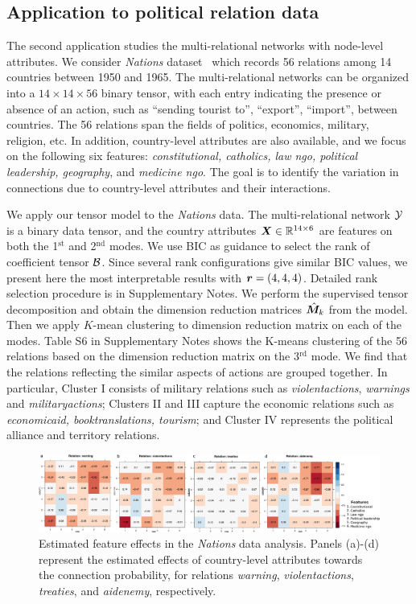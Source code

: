\documentclass[12pt]{article}
\theoremstyle{definition}
\theoremstyle{definition}
\begin{document}
\subsection{Application to political relation data}

The second application studies the multi-relational networks with node-level attributes. We consider \emph{Nations} dataset~\citep{nickel2011three} which records 56 relations among 14 countries between 1950 and 1965. The multi-relational networks can be organized into a $14 \times 14 \times 56$ binary tensor, with each entry indicating the presence or absence of an action, such as ``sending tourist to'', ``export'', ``import'', between countries. The 56 relations span the fields of politics, economics, military, religion, etc. In addition, country-level attributes are also available, and we focus on the following six features: \emph{constitutional, catholics, law ngo, political leadership, geography}, and \emph{medicine ngo}. The goal is to identify the variation in connections due to country-level attributes and their interactions. 

We apply our tensor model to the \emph{Nations} data. The multi-relational network $\mathcal{Y}$ is a binary data tensor, and the country attributes $\bm X\in\mathbb{R}^{14\times 6}$ are features on both the 1$^\text{st}$ and 2$^\text{nd}$ modes. {   We use BIC as guidance to select the rank of coefficient tensor $\mathcal{B}$. Since several rank configurations give similar BIC values, we present here the most interpretable results with $\bm{r}=(4,4,4)$. Detailed rank selection procedure is in Supplementary Notes.}
We perform the supervised tensor decomposition and obtain the dimension reduction matrices $\hat {\bm M}_k$ from the model. Then we apply $K$-mean clustering to dimension reduction matrix on each of the modes. Table S6 in Supplementary Notes shows the K-means clustering of the 56 relations based on the dimension reduction matrix on the 3$^\text{rd}$ mode. We find that the relations reflecting the similar aspects of actions are grouped together. In particular, Cluster I consists of military relations such as \emph{violentactions}, \emph{warnings} and \emph{militaryactions}; Clusters II and III capture the economic relations such as \emph{economicaid, booktranslations, tourism}; and Cluster IV represents the political alliance and territory relations. 

\begin{figure}[!h]
\centering
\includegraphics[width=16cm]{coef.pdf}
\caption{Estimated feature effects in the \emph{Nations} data analysis. Panels (a)-(d) represent the estimated effects of country-level attributes towards the connection probability, for relations \emph{warning}, \emph{violentactions}, \emph{treaties}, and \emph{aidenemy}, respectively. }\label{fig:est}
\end{figure}
\end{document}
